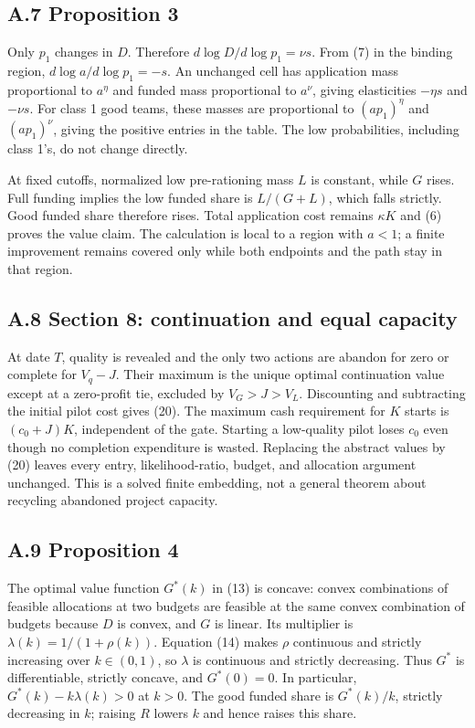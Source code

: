 \documentclass[
  11pt,
]{article}
\begin{document}
\subsection{A.7 Proposition 3}\label{a.7-proposition-3}

Only \(p_1\) changes in \(D\). Therefore \(d\log D/d\log p_1=\nu s\).
From (7) in the binding region, \(d\log a/d\log p_1=-s\). An unchanged
cell has application mass proportional to \(a^\eta\) and funded mass
proportional to \(a^\nu\), giving elasticities \(-\eta s\) and
\(-\nu s\). For class 1 good teams, these masses are proportional to
\((ap_1)^\eta\) and \((ap_1)^\nu\), giving the positive entries in the
table. The low probabilities, including class 1's, do not change
directly.

At fixed cutoffs, normalized low pre-rationing mass \(L\) is constant,
while \(G\) rises. Full funding implies the low funded share is
\(L/(G+L)\), which falls strictly. Good funded share therefore rises.
Total application cost remains \(\kappa K\) and (6) proves the value
claim. The calculation is local to a region with \(a<1\); a finite
improvement remains covered only while both endpoints and the path stay
in that region.

\subsection{A.8 Section 8: continuation and equal
capacity}\label{a.8-section-8-continuation-and-equal-capacity}

At date \(T\), quality is revealed and the only two actions are abandon
for zero or complete for \(V_q-J\). Their maximum is the unique optimal
continuation value except at a zero-profit tie, excluded by
\(V_G>J>V_L\). Discounting and subtracting the initial pilot cost gives
(20). The maximum cash requirement for \(K\) starts is \((c_0+J)K\),
independent of the gate. Starting a low-quality pilot loses \(c_0\) even
though no completion expenditure is wasted. Replacing the abstract
values by (20) leaves every entry, likelihood-ratio, budget, and
allocation argument unchanged. This is a solved finite embedding, not a
general theorem about recycling abandoned project capacity.

\subsection{A.9 Proposition 4}\label{a.9-proposition-4}

The optimal value function \(G^*(k)\) in (13) is concave: convex
combinations of feasible allocations at two budgets are feasible at the
same convex combination of budgets because \(D\) is convex, and \(G\) is
linear. Its multiplier is \(\lambda(k)=1/(1+\rho(k))\). Equation (14)
makes \(\rho\) continuous and strictly increasing over \(k\in(0,1)\), so
\(\lambda\) is continuous and strictly decreasing. Thus \(G^*\) is
differentiable, strictly concave, and \(G^*(0)=0\). In particular,
\(G^*(k)-k\lambda(k)>0\) at \(k>0\). The good funded share is
\(G^*(k)/k\), strictly decreasing in \(k\); raising \(R\) lowers \(k\)
and hence raises this share.
\end{document}
